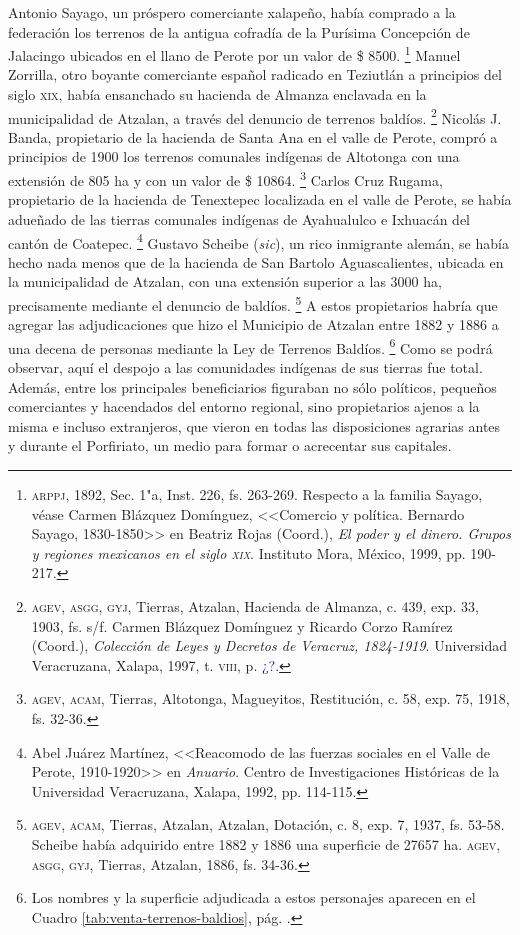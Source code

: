 \documentclass[14pt,twoside,final]{extbook} %
\let\oldfootnote\footnote
\renewcommand\footnote[1]{%
\oldfootnote{\hspace{1mm}#1}}
\begin{document}
Antonio Sayago, un próspero comerciante xalapeño, había comprado a la federación los terrenos de la antigua cofradía de la Purísima Concepción de Jalacingo ubicados en el llano de Perote por un valor de \$ 8500.\footnote{\textsc{arppj}, 1892, Sec. 1"a, Inst. 226, fs. 263-269. Respecto a la familia Sayago, véase Carmen Blázquez Domínguez, <<Comercio y política. Bernardo Sayago, 1830-1850>> en Beatriz Rojas (Coord.), \emph{El poder y el dinero. Grupos y regiones mexicanos en el siglo \textsc{xix}}. Instituto Mora, México, 1999, pp. 190-217.} Manuel Zorrilla, otro
boyante comerciante español radicado en Teziutlán a principios del siglo \textsc{xix}, había ensanchado su hacienda de Almanza enclavada en la municipalidad de Atzalan, a través del denuncio de terrenos baldíos.\footnote{\textsc{agev, asgg, gyj}, Tierras, Atzalan, Hacienda de Almanza, c. 439, exp. 33, 1903, fs. s/f. Carmen Blázquez Domínguez y Ricardo Corzo Ramírez (Coord.), \emph{Colección de Leyes y Decretos de Veracruz, 1824-1919}. Universidad Veracruzana, Xalapa, 1997, t. \textsc{viii}, p. \textcolor{blue}{¿?}.} Nicolás J. Banda, propietario de la hacienda de Santa Ana en el valle de Perote, compró a principios de 1900 los terrenos comunales indígenas de Altotonga con una extensión de 805 ha y con un valor de \$ 10864.\footnote{\textsc{agev, acam}, Tierras, Altotonga, Magueyitos, Restitución, c. 58, exp. 75, 1918, fs. 32-36.} Carlos Cruz Rugama, propietario de la hacienda de Tenextepec localizada en el valle de Perote, se había adueñado de las tierras comunales indígenas de Ayahualulco e Ixhuacán del cantón de Coatepec.\footnote{Abel Juárez Martínez, <<Reacomodo de las fuerzas sociales en el Valle de Perote, 1910-1920>> en \textit{Anuario}. Centro de Investigaciones Históricas de la Universidad Veracruzana, Xalapa, 1992, pp. 114-115.} Gustavo Scheibe (\emph{sic}), un rico inmigrante alemán, se había hecho nada menos que de la hacienda de San Bartolo Aguascalientes, ubicada en la municipalidad de Atzalan, con una extensión superior a las 3000 ha, precisamente mediante el denuncio de baldíos.\footnote{\textsc{agev, acam}, Tierras, Atzalan, Atzalan, Dotación, c. 8, exp. 7, 1937, fs. 53-58. Scheibe había adquirido entre 1882 y 1886 una superficie de 27657 ha. \textsc{agev, asgg, gyj}, Tierras, Atzalan, 1886, fs. 34-36.} A estos propietarios habría que agregar las adjudicaciones que hizo el Municipio de Atzalan entre 1882 y 1886 a una decena de personas mediante la Ley de Terrenos Baldíos.\footnote{Los nombres y la superficie adjudicada a estos personajes aparecen en el Cuadro  \ref{tab:venta-terrenos-baldios}, pág. \pageref{tab:venta-terrenos-baldios}.} Como se podrá observar, aquí el despojo a las comunidades indígenas de sus tierras fue total. Además, entre los principales beneficiarios figuraban no sólo políticos, pequeños comerciantes y hacendados del entorno regional, sino propietarios ajenos a la misma e incluso extranjeros, que vieron en todas las disposiciones agrarias antes y durante el Porfiriato, un medio para formar o acrecentar sus capitales.
\end{document}
